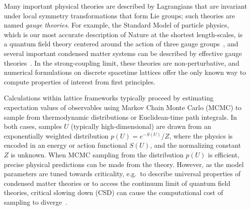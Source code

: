 Many important physical theories are described by Lagrangians that are invariant under local symmetry transformations that form Lie groups; such theories are named {\it gauge theories}.
For example, the Standard Model of particle physics, which is our most accurate description of Nature at the shortest length-scales, is a quantum field theory centered around the action of three gauge groups~\cite{Weinberg:1967,Salam:1968rm,Greenberg:1964,Han:1965}, and several important condensed matter systems can be described by effective gauge theories~\cite{Kogut1979SpinSystems, Seiberg2016GaugeCMTDuality,Sachdev2018EmergentGauge,Guo2020EmergentGauge}.
In the strong-coupling limit, these theories are non-perturbative, and numerical formulations on discrete spacetime lattices offer the only known way to compute properties of interest from first principles.

Calculations within lattice frameworks typically proceed by estimating expectation values of observables using Markov Chain Monte Carlo (MCMC) to sample from thermodynamic distributions or Euclidean-time path integrals. In both cases, samples $U$ (typically high-dimensional) are drawn from an exponentially weighted distribution $p(U) = e^{-S(U)} / Z$, where the physics is encoded in an energy or action functional $S(U)$, and the normalizing constant $Z$ is unknown. When MCMC sampling from the distribution $p(U)$ is efficient, precise physical predictions can be made from the theory. However, as the model parameters are tuned towards criticality, e.g.~to describe universal properties of condensed matter theories or to access the continuum limit of quantum field theories, critical slowing down (CSD) can cause the computational cost of sampling to diverge~\cite{Wolff:1989wq}.

